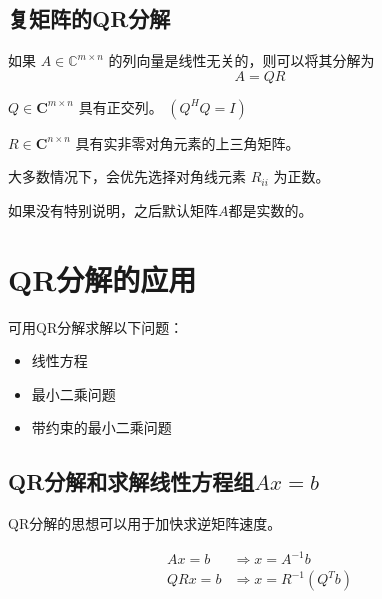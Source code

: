

\subsection{复矩阵的QR分解}

\begin{theorem}
    如果 $A \in \mathbb{C}^{m \times n}$ 的列向量是线性无关的，则可以将其分解为
$$
A=Q R
$$

$Q \in \boldsymbol{C}^{m \times n}$ 具有正交列。 $\left(Q^{H} Q=I\right)$

$R \in \boldsymbol{C}^{n \times n}$ 具有实非零对角元素的上三角矩阵。
\end{theorem}

大多数情况下，会优先选择对角线元素 $R_{i i}$ 为正数。

如果没有特别说明，之后默认矩阵$A$都是实数的。

\section{QR分解的应用}

可用QR分解求解以下问题：

\begin{itemize}
    \item 线性方程
    \item 最小二乘问题
    \item 带约束的最小二乘问题
\end{itemize}

\subsection{QR分解和求解线性方程组$Ax = b$}

QR分解的思想可以用于加快求逆矩阵速度。

\begin{corollary}
$$\begin{aligned}
   Ax = b &\Rightarrow x = A^{-1} b \\
QRx = b &\Rightarrow x = R^{-1} \left(Q^Tb\right)
\end{aligned}
$$
\end{corollary}

